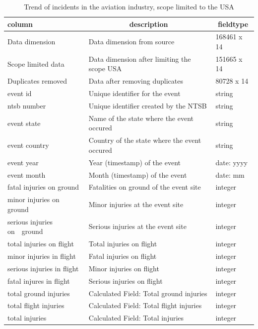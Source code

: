 \documentclass[
  man,floatsintext]{apa7}
\begin{document}
\begin{table}[tbp]

\begin{center}
\begin{threeparttable}

\caption{\label{tab:aviation-incidents-schema}Trend of incidents in the aviation industry, scope limited to the USA}

\begin{tabular}{lll}
\toprule
column & \multicolumn{1}{c}{description} & \multicolumn{1}{c}{fieldtype}\\
\midrule
Data dimension & Data dimension from source & 168461 x 14\\
Scope limited data & Data dimension after limiting the scope USA & 151665 x 14\\
Duplicates removed & Data after removing duplicates & 80728 x 14\\
event id & Unique identifier for the event & string\\
ntsb number & Unique identifier created by the NTSB & string\\
event state & Name of the state where the event occured & string\\
event country & Country of the state where the event occured & string\\
event year & Year (timestamp) of the event & date: yyyy\\
event month & Month (timestamp) of the event & date: mm\\
fatal injuries on ground & Fatalities on ground of the event site & integer\\
minor injuries on ground & Minor injuries at the event site & integer\\
serious injuries on\ \ ground & Serious injuries at the event site & integer\\
total injuries on flight & Total injuries on flight & integer\\
minor injuries in flight & Fatal injuries on flight & integer\\
serious injuries in flight & Minor injuries on flight & integer\\
fatal injures in flight & Serious injuries on flight & integer\\
total ground injuries & Calculated Field: Total ground injuries & integer\\
total flight injuries & Calculated Field: Total flight injuries & integer\\
total injuries & Calculated Field: Total injuries & integer\\
\bottomrule
\end{tabular}

\end{threeparttable}
\end{center}

\end{table}
\end{document}
